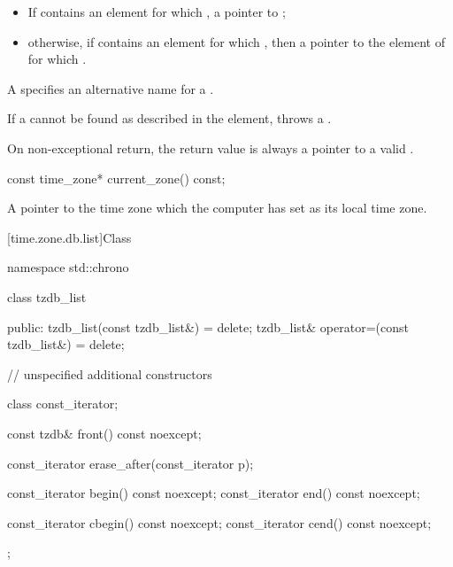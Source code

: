 \begin{itemdescr}
\pnum
\returns
\begin{itemize}
\item
If  contains an element 
for which ,
a pointer to ;
\item
otherwise,
if  contains an element 
for which ,
then a pointer to the element  of 
for which .
\end{itemize}
\begin{note}
A  specifies an alternative name for a .
\end{note}

\pnum
\throws
If a  cannot be found
as described in the \returns element,
throws a .
\begin{note}
On non-exceptional return, the return value is always a pointer to a valid .
\end{note}
\end{itemdescr}

%
\begin{itemdecl}
const time_zone* current_zone() const;
\end{itemdecl}

\begin{itemdescr}
\pnum
\returns
A pointer to the time zone which the computer has set as its local time zone.
\end{itemdescr}

[time.zone.db.list]{Class }

\begin{codeblock}
namespace std::chrono {
  class tzdb_list {
  public:
    tzdb_list(const tzdb_list&) = delete;
    tzdb_list& operator=(const tzdb_list&) = delete;

    // unspecified additional constructors

    class const_iterator;

    const tzdb& front() const noexcept;

    const_iterator erase_after(const_iterator p);

    const_iterator begin() const noexcept;
    const_iterator end()   const noexcept;

    const_iterator cbegin() const noexcept;
    const_iterator cend()   const noexcept;
  };
}
\end{codeblock}

